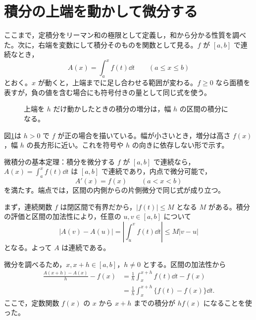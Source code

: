 \section{積分の上端を動かして微分する}\label{節:基本定理第一}
ここまで，定積分をリーマン和の極限として定義し，和から分かる性質を調べた。次に，右端を変数にして積分そのものを関数として見る。$f$ が $[a,b]$ で連続なとき，
\[
 A(x)=\int_a^x f(t)\dd t\qquad(a\le x\le b)
\]
とおく。$x$ が動くと，上端までに足し合わせる範囲が変わる。$f\ge0$ なら面積を表すが，負の値を含む場合にも符号付きの量として同じ式を使う。

\begin{figure}[htbp]
\centering
{}
\caption{上端を $h$ だけ動かしたときの積分の増分は，幅 $h$ の区間の積分になる。}
\label{図:面積関数増分}
\end{figure}

図\ref{図:面積関数増分}は $h>0$ で $f$ が正の場合を描いている。幅が小さいとき，増分は高さ $f(x)$，幅 $h$ の長方形に近い。これを符号や $h$ の向きに依存しない形で示す。

\begin{theorem}{微積分の基本定理：積分を微分する}\label{定理:基本定理第一}
$f$ が $[a,b]$ で連続なら，$A(x)=\int_a^x f(t)\dd t$ は $[a,b]$ で連続であり，内点で微分可能で，
\[
 A'(x)=f(x)\qquad(a<x<b)
\]
を満たす。端点では，区間の内側からの片側微分で同じ式が成り立つ。
\end{theorem}

まず，連続関数 $f$ は閉区間で有界だから，$|f(t)|\le M$ となる $M$ がある。積分の評価と区間の加法性により，任意の $u,v\in[a,b]$ について
\[
 |A(v)-A(u)|=\left|\int_u^v f(t)\dd t\right|
 \le M|v-u|
\]
となる。よって $A$ は連続である。

微分を調べるため，$x,x+h\in[a,b]$，$h\ne0$ とする。区間の加法性から
\begin{align*}
 \frac{A(x+h)-A(x)}h-f(x)
 &=\frac1h\int_x^{x+h}f(t)\dd t-f(x)\\
 &=\frac1h\int_x^{x+h}\{f(t)-f(x)\}\dd t.
\end{align*}
ここで，定数関数 $f(x)$ の $x$ から $x+h$ までの積分が $hf(x)$ になることを使った。


